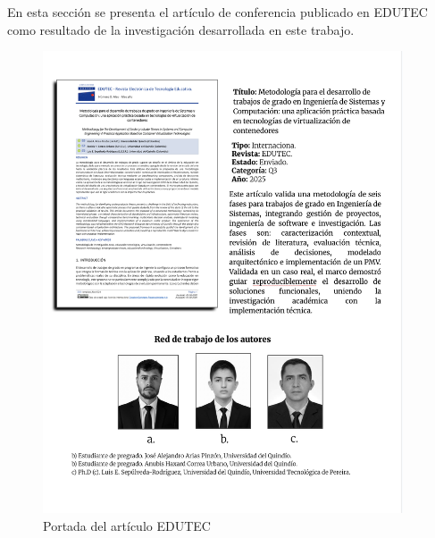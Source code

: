 En esta sección se presenta el artículo de conferencia publicado en EDUTEC como resultado de la investigación desarrollada en este trabajo.

\begin{figure}[H]
    \centering
    \begin{tcolorbox}[
        colback=white,
        colframe=gray!50,
        boxrule=1pt,
        arc=2pt,
        boxsep=5pt,
        left=3pt,
        right=3pt,
        top=3pt,
        bottom=3pt,
        drop shadow
    ]
        \includegraphics[width=0.95\textwidth,keepaspectratio]{apendices/PORTADA-ART/EDUTEC-PORTADA.png}
    \end{tcolorbox}
    \caption{Portada del artículo EDUTEC}\label{fig:edutec-portada}
\end{figure}
\FloatBarrier

